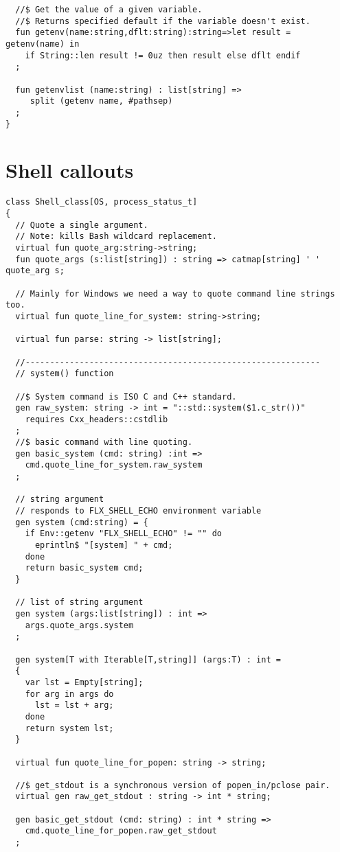 \documentclass[oneside]{book}
\begin{document}
{\begin{verbatim}
  //$ Get the value of a given variable.
  //$ Returns specified default if the variable doesn't exist.
  fun getenv(name:string,dflt:string):string=>let result = getenv(name) in 
    if String::len result != 0uz then result else dflt endif
  ;

  fun getenvlist (name:string) : list[string] =>
     split (getenv name, #pathsep)
  ;
}
\end{verbatim}

\section{Shell callouts}
\begin{verbatim}
class Shell_class[OS, process_status_t]
{
  // Quote a single argument.
  // Note: kills Bash wildcard replacement.
  virtual fun quote_arg:string->string;
  fun quote_args (s:list[string]) : string => catmap[string] ' ' quote_arg s;

  // Mainly for Windows we need a way to quote command line strings too.
  virtual fun quote_line_for_system: string->string;

  virtual fun parse: string -> list[string];

  //------------------------------------------------------------
  // system() function

  //$ System command is ISO C and C++ standard.
  gen raw_system: string -> int = "::std::system($1.c_str())"
    requires Cxx_headers::cstdlib
  ;
  //$ basic command with line quoting.
  gen basic_system (cmd: string) :int => 
    cmd.quote_line_for_system.raw_system
  ;

  // string argument
  // responds to FLX_SHELL_ECHO environment variable
  gen system (cmd:string) = {
    if Env::getenv "FLX_SHELL_ECHO" != "" do
      eprintln$ "[system] " + cmd;
    done
    return basic_system cmd;
  }

  // list of string argument
  gen system (args:list[string]) : int =>
    args.quote_args.system
  ;

  gen system[T with Iterable[T,string]] (args:T) : int =
  {
    var lst = Empty[string];
    for arg in args do 
      lst = lst + arg; 
    done
    return system lst;
  }  

  virtual fun quote_line_for_popen: string -> string;

  //$ get_stdout is a synchronous version of popen_in/pclose pair.
  virtual gen raw_get_stdout : string -> int * string;
 
  gen basic_get_stdout (cmd: string) : int * string =>
    cmd.quote_line_for_popen.raw_get_stdout
  ;


\end{verbatim}}
\end{document}
